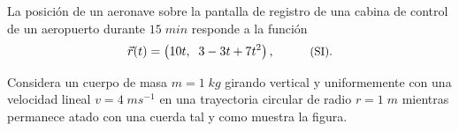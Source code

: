 \documentclass[a4paper,addpoints,14pt]{exam}
\begin{document}
\begin{questions}

	\question La posición de un aeronave sobre la pantalla de registro de una cabina de control de un aeropuerto durante $15\;min$ responde a la función
	\[\vec{r}(t)=\left(10t,\;\;3-3t+7t^2\right),\hspace{1cm}\text{\small (SI).}\]
	
\begin{minipage}{.5\textwidth}
	

	\question Considera un cuerpo de masa $m=1\;kg$ girando vertical y uniformemente con una velocidad lineal $v=4\;ms^{-1}$ en una trayectoria circular de radio $r=1\;m$ mientras permanece atado con una cuerda tal y como muestra la figura. 
		\vspace{1ex}
		
		

	\end{minipage}\hfill
	\begin{minipage}{.35\textwidth}
	\vspace*{4ex}
	
		{\centering
		\def\svgwidth{.9\linewidth}
		
		\par
		
		}

	\end{minipage}
	\newpage
		

\end{questions}
\end{document}
